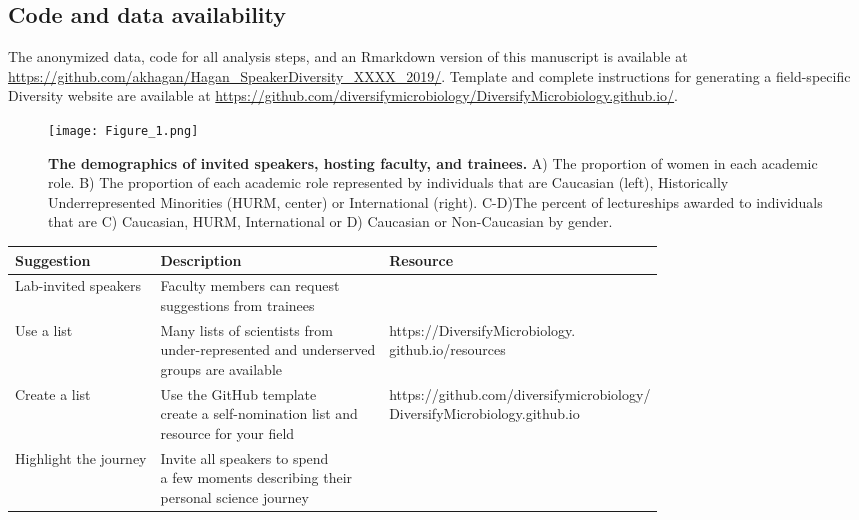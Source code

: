 \documentclass[10pt,]{article}
\begin{document}
\subsection{Code and data
availability}\label{code-and-data-availability}

The anonymized data, code for all analysis steps, and an Rmarkdown
version of this manuscript is available at
\url{https://github.com/akhagan/Hagan_SpeakerDiversity_XXXX_2019/}.
Template and complete instructions for generating a field-specific
Diversity website are available at
\url{https://github.com/diversifymicrobiology/DiversifyMicrobiology.github.io/}.

\begin{figure}
\centering
\texttt{[image: Figure\_1.png]}
\caption{\textbf{The demographics of invited speakers, hosting faculty,
and trainees.} A) The proportion of women in each academic role. B) The
proportion of each academic role represented by individuals that are
Caucasian (left), Historically Underrepresented Minorities (HURM,
center) or International (right). C-D)The percent of lectureships
awarded to individuals that are C) Caucasian, HURM, International or D)
Caucasian or Non-Caucasian by gender.}
\end{figure}

\newpage

\begin{center}
\small
\begin{tabular}{|l|l|l|}
\hline

\rowcolor{lightgray}
\textbf{Suggestion} & \textbf{Description} & \textbf{Resource} \\ \hline

Lab-invited speakers & \makecell[l]{Faculty members can request \\suggestions from trainees} & \\ \hline

Use a list & \makecell[l]{Many lists of scientists from \\under-represented and underserved \\groups are available} &  \makecell[l]{https://DiversifyMicrobiology.\\github.io/resources}\\ \hline

Create a list & \makecell[l]{Use the GitHub template \\ create a self-nomination list and \\resource for your field} & \makecell[l]{https://github.com/diversifymicrobiology/\\DiversifyMicrobiology.github.io} \\ \hline

Highlight the journey & \makecell[l]{Invite all speakers to spend \\a few moments describing their \\personal science journey} & \\ \hline

\end{tabular}
\end{center}
\end{document}

